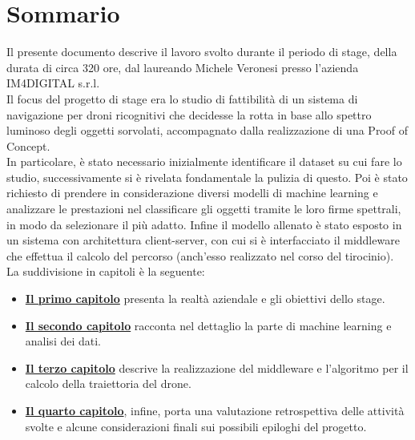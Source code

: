 
\cleardoublepage
{}
{}
\begingroup
\let\clearpage\relax
\let\cleardoublepage\relax
\let\cleardoublepage\relax

\chapter*{Sommario}

Il presente documento descrive il lavoro svolto durante il periodo di stage, della durata di circa 320 ore, dal laureando Michele Veronesi presso l'azienda IM4DIGITAL s.r.l.\\
Il focus del progetto di stage era lo studio di fattibilità di un sistema di navigazione per droni ricognitivi che decidesse la rotta in base allo spettro luminoso degli oggetti sorvolati,
accompagnato dalla realizzazione di una Proof of Concept.\\
In particolare, è stato necessario inizialmente identificare il dataset su cui fare lo studio, successivamente si è rivelata fondamentale la pulizia di questo.
Poi è stato richiesto di prendere in considerazione diversi modelli di machine learning e analizzare le prestazioni nel classificare gli oggetti tramite le loro firme spettrali,
in modo da selezionare il più adatto.
Infine il modello allenato è stato esposto in un sistema con architettura client-server, con cui si è interfacciato il middleware che effettua il calcolo del percorso (anch'esso realizzato nel corso del tirocinio).\\
La suddivisione in capitoli è la seguente:
\begin{itemize}
    \item \textbf{{\hyperref[cap:introduzione]{Il primo capitolo}}} presenta la realtà aziendale e gli obiettivi dello stage.
    
    \item \textbf{{\hyperref[cap:machine-learning]{Il secondo capitolo}}} racconta nel dettaglio la parte di machine learning e analisi dei dati.
    
    \item \textbf{{\hyperref[cap:business-logic]{Il terzo capitolo}}} descrive la realizzazione del middleware e l'algoritmo per il calcolo della traiettoria del drone.
    
    \item \textbf{{\hyperref[cap:conclusione]{Il quarto capitolo}}}, infine, porta una valutazione retrospettiva delle attività svolte e alcune considerazioni finali sui possibili epiloghi del progetto.
\end{itemize}


\endgroup			

\vfill
